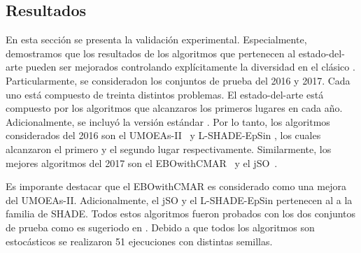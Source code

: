 \subsection{Resultados}
En esta sección se presenta la validación experimental.
%
Especialmente, demostramos que los resultados de los algoritmos que pertenecen al estado-del-arte pueden ser mejorados controlando explícitamente la diversidad en el clásico \DE{}.
%
Particularmente, se consideradon los conjuntos de prueba del \CEC{} 2016 y \CEC{} 2017.
%
Cada uno está compuesto de treinta distintos problemas.
%
El estado-del-arte está compuesto por los algoritmos que alcanzaros los primeros lugares en cada año.
%
Adicionalmente, se incluyó la versión estándar \DE{}.
%
Por lo tanto, los algoritmos considerados del \CEC{} 2016 son el UMOEAs-II~\cite{elsayed2016testing} y L-SHADE-EpSin \cite{awad2016ensemble}, los cuales alcanzaron el primero y el segundo lugar respectivamente.
%
Similarmente, los mejores algoritmos del \CEC{} 2017 son el EBOwithCMAR~\cite{kumar2017improving} y el jSO~\cite{brest2017single}.

%
Es imporante destacar que el EBOwithCMAR es considerado como una mejora del UMOEAs-II.
%
Adicionalmente, el jSO y el L-SHADE-EpSin pertenecen al a la familia de SHADE.
%
Todos estos algoritmos fueron probados con los dos conjuntos de prueba como es sugeriodo en \cite{molina2017analysis}.
Debido a que todos los algoritmos son estocásticos se realizaron 51 ejecuciones con distintas semillas.
%

